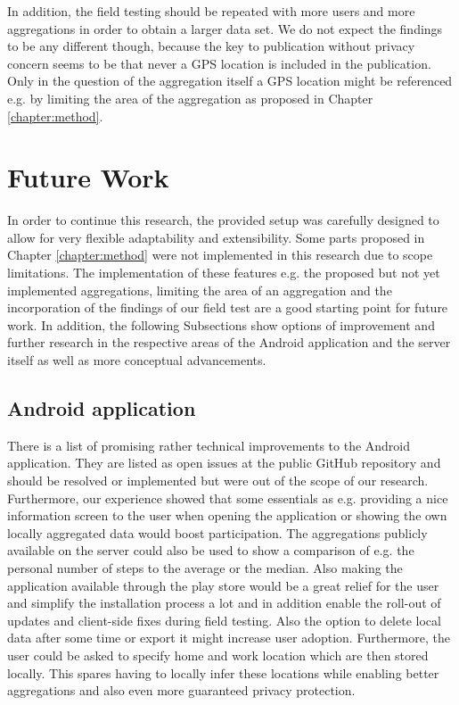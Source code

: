 In addition, the field testing should be repeated with more users and more aggregations in order to obtain a larger data set. We do not expect the findings to be any different though, because the key to publication without privacy concern seems to be that never a GPS location is included in the publication. Only in the question of the aggregation itself a GPS location might be referenced e.g. by limiting the area of the aggregation as proposed in Chapter \ref{chapter:method}.

\section{Future Work}
In order to continue this research, the provided setup was carefully designed to allow for very flexible adaptability and extensibility. Some parts proposed in Chapter \ref{chapter:method} were not implemented in this research due to scope limitations. The implementation of these features e.g. the proposed but not yet implemented aggregations, limiting the area of an aggregation and the incorporation of the findings of our field test are a good starting point for future work. In addition, the following Subsections show options of improvement and further research in the respective areas of the Android application and the server itself as well as more conceptual advancements.

\subsection{Android application}\label{future-android}
There is a list of promising rather technical improvements to the Android application. They are listed as open issues at the public GitHub repository and should be resolved or implemented but were out of the scope of our research. Furthermore, our experience showed that some essentials as e.g. providing a nice information screen to the user when opening the application or showing the own locally aggregated data would boost participation. The aggregations publicly available on the server could also be used to show a comparison of e.g. the personal number of steps to the average or the median. Also making the application available through the play store would be a great relief for the user and simplify the installation process a lot and in addition enable the roll-out of updates and client-side fixes during field testing. Also the option to delete local data after some time or export it might increase user adoption. Furthermore, the user could be asked to specify home and work location which are then stored locally. This spares having to locally infer these locations while enabling better aggregations and also even more guaranteed privacy protection.


